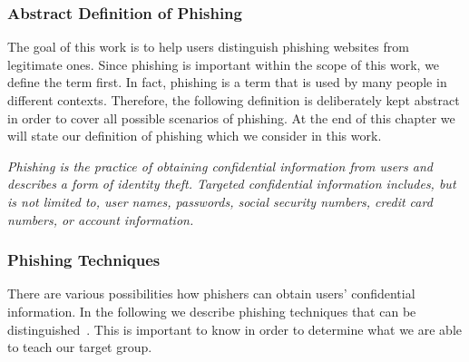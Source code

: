 \subsubsection{Abstract Definition of Phishing}
\label{s:phishing_def}
The goal of this work is to help users distinguish phishing websites from legitimate ones. 
 Since phishing is important within the scope of this work, we define the term first. In fact, phishing is a term that is used by many people in different contexts. Therefore, the following definition is deliberately kept abstract in order to cover all possible scenarios of phishing. At the end of this chapter we will state our definition of phishing which we consider in this work.

\begin{center}
\textit{Phishing is the practice of obtaining confidential information from users and describes a form of identity theft.
 Targeted confidential information includes, but is not limited to, user names, passwords, social security numbers, credit card numbers, or account information.}~\cite{jakobsson2006phishing}
\end{center}

\subsubsection{Phishing Techniques}
\label{s:phishing_techs}
There are various possibilities how phishers can obtain users' confidential information.
 In the following we describe phishing techniques that can be distinguished~\cite{jakobsson2006phishing, phishingtechniques}.
 This is important to know in order to determine what we are able to teach our target group.

